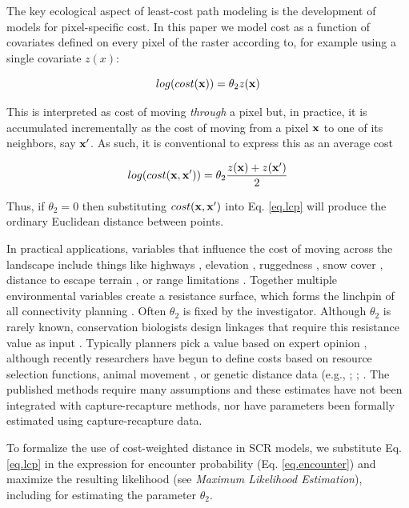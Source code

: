 \documentclass[12pt]{article}
\begin{document}
The key ecological aspect of least-cost path modeling is the
development 
of models for pixel-specific cost. 
In this paper we model cost as a function of covariates
defined on every pixel of the raster according to, for example using a
single covariate $z(x)$:

\begin{equation}
 log(cost({\bf x}))=  \theta_{2} z({\bf x})
\label{eq.cost}
\end{equation}

{\flushleft This} is interpreted as cost of moving {\it through} a pixel but, in practice, it is accumulated 
incrementally as the cost of moving from a pixel ${\bf x}$ to one of its neighbors, say ${\bf x}'$. As such, it is conventional
to express this as an average cost 

\[
 log(cost({\bf x},{\bf x}'))=  \theta_{2} \frac{z({\bf x})+z({\bf x}')}{2}
\]

{\flushleft
Thus,} if $\theta_{2} = 0$ then substituting $cost({\bf x},{\bf x}')$ into
Eq. \ref{eq.lcp} will produce the ordinary Euclidean distance
between points.

In practical applications, variables that
influence the cost of moving across the landscape include things like
highways  \citep[e.g.,][]{epps_etal:2005}, elevation
\citep{cushman_etal:2006},
ruggedness \citep{epps_etal:2007}, snow cover \citep{schwartz_etal:2009},
distance to escape terrain \citep{shirk_etal:2010}, or range limitations
\citep{mcrae_beier:2007}.  Together multiple environmental variables create
a resistance surface, which forms the linchpin of all connectivity
planning \citep{spear_etal:2010}.  Often $\theta_{2}$ is fixed by the
investigator. Although
 $\theta_{2}$ is rarely known,
 conservation
biologists design linkages that require this resistance value as input
\citep[see][and articles cited therein]{beier_etal:2008}.  Typically planners pick a value based on
expert opinion \citep{beier_etal:2008}, although recently researchers
have begun to define costs based on resource selection functions,
animal movement \citep{tracy:2006, fortin_etal:2005}, or genetic
distance data (e.g., \citet{gerlach_musolf:2000};
\citet{epps_etal:2007}; \citet{schwartz_etal:2009}. The published
methods require many assumptions and these estimates have not been
integrated with capture-recapture methods, nor have parameters been
formally estimated using capture-recapture data.

To formalize the use of cost-weighted distance in SCR models, we
substitute Eq. \ref{eq.lcp} in the expression for encounter
probability (Eq. \ref{eq.encounter}) and maximize the resulting
likelihood (see {\it Maximum Likelihood Estimation}), including for estimating the
parameter $\theta_{2}$.
\end{document}
